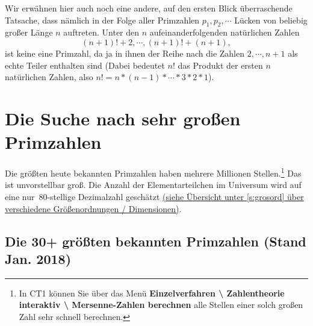 \begin{refsegment}
Wir erwähnen hier auch noch eine andere, auf den ersten Blick
überraschende Tatsache, dass nämlich in der Folge aller
Primzahlen $p_1, p_2, \cdots $ Lücken von beliebig großer
Länge $n$ auftreten. Unter den $n$ aufeinanderfolgenden
natürlichen Zahlen
$$
    (n+1)!+2, \cdots, (n+1)!+(n+1),
$$
ist keine eine Primzahl, da ja in ihnen der Reihe nach die
Zahlen $2,\cdots, n+1$ als echte Teiler enthalten sind
(Dabei bedeutet $n!$ das Produkt der ersten $n$ natürlichen
Zahlen, also $n!=n*(n-1)* \cdots *3*2*1$).


\newpage
\section{Die Suche nach sehr großen Primzahlen}
\label{search_for_very_big_primes}   %

Die größten heute bekannten Primzahlen haben mehrere
Millionen Stellen.\footnote{%
	In CT1 können Sie über das Menü
	\textbf{Einzelverfahren \textbackslash{} Zahlentheorie
	interaktiv \textbackslash{} Mersenne-Zahlen berechnen}
	alle Stellen einer solch großen Zahl sehr schnell berechnen.
}
Das ist unvorstellbar groß. Die Anzahl der Elementarteilchen im
Universum wird auf eine \glqq nur\grqq\ $80$-stellige Dezimalzahl
geschätzt \hyperlink{grosord}{(siehe Übersicht unter \ref{s:grosord}
über verschiedene Größenordnungen / Dimensionen)}.



\hypertarget{RecordPrimes}{}
\subsection{Die 30+ größten bekannten Primzahlen (Stand Jan. 2018)}  %
\label{RecordPrimes}


\end{refsegment}

